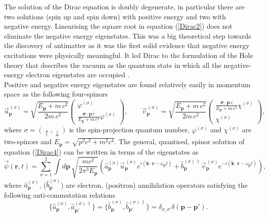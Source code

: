\documentclass[a4paper,11pt]{article}
\newcommand{\beq}{\begin{equation}}
\newcommand{\eeq}{\end{equation}}
\newcommand{\kk}{\mathbf{k}}
\newcommand{\p}{\mathbf{p}}
\newcommand{\rr}{\mathbf{r}}
\begin{document}
The solution of the Dirac equation is doubly degenerate, in particular there are two solutions (spin up and spin down) with positive energy and two with negative energy. Linearising the square root in equation (\ref{Dirac2}) does not eliminate the negative energy eigenstates. This was a big theoretical step towards the discovery of antimatter as it was the first solid evidence that negative energy excitations were physically meaningful. It led Dirac to the formulation of the Hole theory that describes the vacuum as the quantum state in which all the negative-energy electron eigenstates are occupied \cite{DiracP}. \\Positive and negative energy eigenstates are found relatively easily in momentum space as the following four-spinors 
\beq
\vec u^{\,(\sigma)}_{\p} = \sqrt{\frac{E_\p + m \,c^2}{2m\,c^2}}\left(\begin{array}{c}\varphi^{(\sigma)} \\ \frac{ \boldsymbol{\sigma} \cdot \mathbf p \,c}{E_\p + m\,c^2} \varphi^{(\sigma)} \end{array}\right), \quad \quad
\vec v^{\,(\sigma)}_{\p} = \sqrt{\frac{E_\p + m\,c^2}{2m\,c^2}}\left(\begin{array}{c}  \frac{ \boldsymbol{\sigma} \cdot \mathbf p\, c}{E_\p + m\,c^2} \chi^{(\sigma)}  \\ \chi^{(\sigma)} \end{array}\right),
\eeq
where $\sigma=(\uparrow,\downarrow)$ is the spin-projection quantum number, $\varphi^{(\sigma)}$ and $\chi^{(\sigma)}$ are two-spinors and $E_\p = \sqrt{p^2c^2 + m^2c^4}$. The general, quantised, spinor solution of equation (\ref{Dirac4}) can be written in terms of the eigenstates as 
\beq
\vec \psi(\rr,t) = \sum_{\sigma=1}^2 \int d\p \,  \sqrt{\frac{m c^2}{2 \pi^3 E_\p}} (\hat a_\p^{(\sigma)}  \vec u^{\,(\sigma)}_{\p}  e^{i(\kk \cdot \rr - \omega_\p t) }+ \hat b^{(\sigma) \, \dagger}_\p \vec v^{\,(\sigma)}_{\p}  e^{-i(\kk \cdot \rr - \omega_\p t)}),
\eeq
where $\hat a_\p^{(\sigma)}$, ($\hat b_\p^{(\sigma)}$) are electron, (positron) annihilation operators satisfying the following anti-commutation relations 
\beq
\{\hat a_\p^{(\sigma)},\hat a^{(\sigma)\, \dagger}_{\p'}\} = \{\hat b_\p^{(\sigma)}, \hat b^{(\sigma) \, \dagger}_{\p'}\} = \delta_{\sigma,\sigma'} \delta(\p-\p').
\eeq
\end{document}
